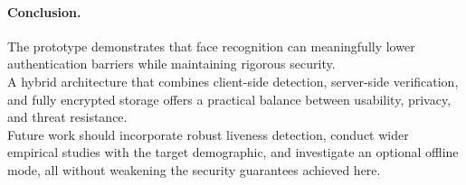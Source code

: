 \paragraph{Conclusion.}
The prototype demonstrates that face recognition can meaningfully lower authentication barriers while maintaining rigorous security. \\ 
A hybrid architecture that combines client-side detection, server-side verification, and fully encrypted storage offers a practical balance between usability, privacy, and threat resistance. \\ 
Future work should incorporate robust liveness detection, conduct wider empirical studies with the target demographic, and investigate an optional offline mode, all without weakening the security guarantees achieved here.\\
